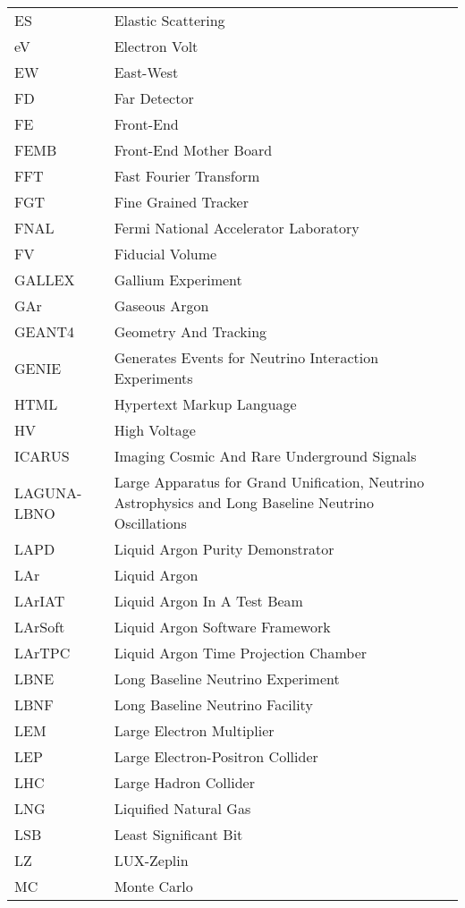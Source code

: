 \begin{longtable}{l p{11cm}}
ES          & Elastic Scattering \\
eV          & Electron Volt \\
EW          & East-West \\
FD          & Far Detector \\
FE          & Front-End \\
FEMB        & Front-End Mother Board \\
FFT         & Fast Fourier Transform \\
FGT         & Fine Grained Tracker \\
FNAL        & Fermi National Accelerator Laboratory \\
FV          & Fiducial Volume \\
GALLEX      & Gallium Experiment \\
GAr         & Gaseous Argon \\
GEANT4      & Geometry And Tracking \\
GENIE       & Generates Events for Neutrino Interaction Experiments \\
HTML        & Hypertext Markup Language \\
HV          & High Voltage \\
ICARUS      & Imaging Cosmic And Rare Underground Signals \\
LAGUNA-LBNO & Large Apparatus for Grand Unification, Neutrino Astrophysics and Long Baseline Neutrino Oscillations \\
LAPD        & Liquid Argon Purity Demonstrator \\
LAr         & Liquid Argon \\
LArIAT      & Liquid Argon In A Test Beam \\
LArSoft     & Liquid Argon Software Framework \\
LArTPC      & Liquid Argon Time Projection Chamber \\
LBNE        & Long Baseline Neutrino Experiment \\
LBNF        & Long Baseline Neutrino Facility \\
LEM         & Large Electron Multiplier\\
LEP         & Large Electron-Positron Collider\\
LHC         & Large Hadron Collider \\
LNG         & Liquified Natural Gas \\
LSB         & Least Significant Bit \\
LZ          & LUX-Zeplin \\
MC          & Monte Carlo \\

\end{longtable}
